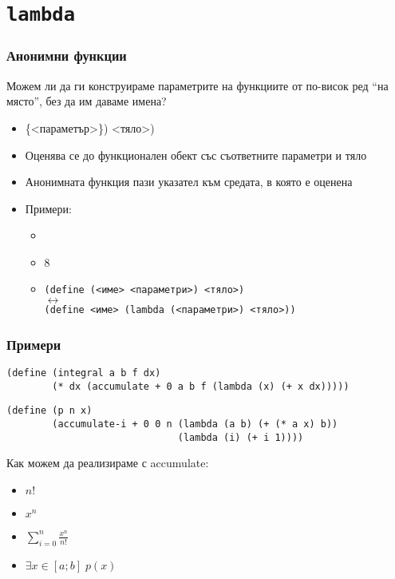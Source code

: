 \documentclass{beamer}
\begin{document}
\section{\tt{lambda}}

\begin{frame}
  \frametitle{Анонимни функции}

  Можем ли да ги конструираме параметрите на функциите от по-висок ред ``на място'', без да им даваме имена?
  \vspace{0.5em}

  \pause
  \begin{itemize}[<+->]
  \item {}\{<параметър>\}\tta) <тяло>\tta)
  \item Оценява се до функционален обект със съответните параметри и тяло
  \item \alert{Анонимната функция пази указател към средата, в която е оценена}
  \item Примери:
    \begin{itemize}
    \item {}
    \item {}8
    \item
        \tt{(define (}<име> <параметри>\tt) <тяло>\tt)\\
        $\longleftrightarrow$\\
        \tt{(define }<име> \tt{(lambda (}<параметри>\tt) <тяло>\tt{))}
    \end{itemize}
  \end{itemize}
\end{frame}

\begin{frame}[fragile]
  \frametitle{Примери}

\begin{verbatim}
(define (integral a b f dx)
        (* dx (accumulate + 0 a b f (lambda (x) (+ x dx)))))
\end{verbatim}

\pause

\begin{verbatim}
(define (p n x)
        (accumulate-i + 0 0 n (lambda (a b) (+ (* a x) b))
                              (lambda (i) (+ i 1))))
\end{verbatim}

\pause

Как можем да реализираме с accumulate:
\begin{itemize}
\item $n!$
\item $x^n$
\item $\sum_{i=0}^n \frac{x^n}{n!}$
\item $\exists x\in[a;b]\; p(x)$
\end{itemize}
\end{frame}
\end{document}
